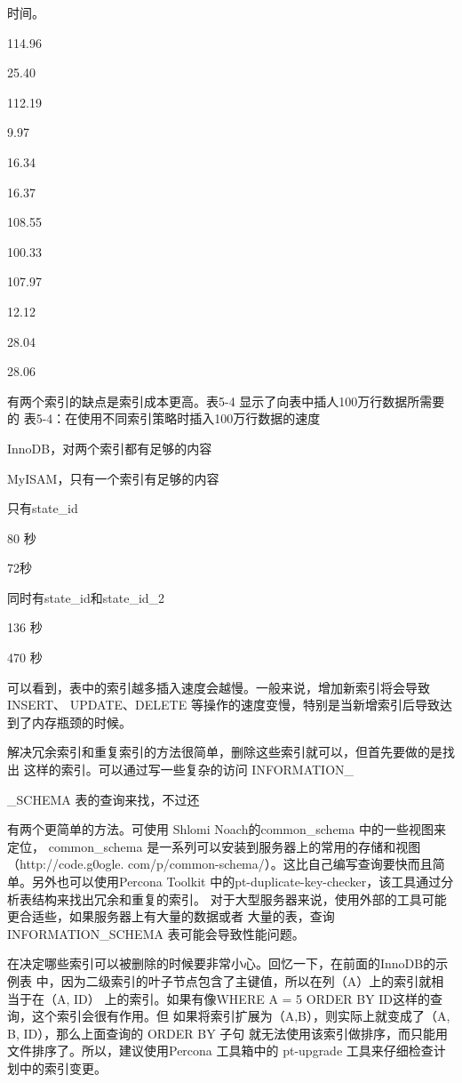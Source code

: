 时间。

114.96

25.40

112.19

9.97

16.34

16.37

108.55

100.33

107.97

12.12

28.04

28.06

有两个索引的缺点是索引成本更高。表5-4 显示了向表中插人100万行数据所需要的
表5-4：在使用不同索引策略时插入100万行数据的速度

InnoDB，对两个索引都有足够的内容

MyISAM，只有一个索引有足够的内容

只有state\_id

80 秒

72秒

同时有state\_id和state\_id\_2

136 秒

470 秒

可以看到，表中的索引越多插入速度会越慢。一般来说，增加新索引将会导致 INSERT、
UPDATE、DELETE 等操作的速度变慢，特别是当新增索引后导致达到了内存瓶颈的时候。

解决冗余索引和重复索引的方法很简单，删除这些索引就可以，但首先要做的是找出
这样的索引。可以通过写一些复杂的访问 INFORMATION\_

\_SCHEMA 表的查询来找，不过还

有两个更简单的方法。可使用 Shlomi Noach的common\_schema 中的一些视图来定位，
common\_schema 是一系列可以安装到服务器上的常用的存储和视图 （http://code.g0ogle.
com/p/common-schema/）。这比自己编写查询要快而且简单。另外也可以使用Percona
Toolkit 中的pt-duplicate-key-checker，该工具通过分析表结构来找出冗余和重复的索引。
对于大型服务器来说，使用外部的工具可能更合适些，如果服务器上有大量的数据或者
大量的表，查询 INFORMATION\_SCHEMA 表可能会导致性能问题。

在决定哪些索引可以被删除的时候要非常小心。回忆一下，在前面的InnoDB的示例表
中，因为二级索引的叶子节点包含了主键值，所以在列（A）上的索引就相当于在（A, ID）
上的索引。如果有像WHERE A = 5 ORDER BY ID这样的查询，这个索引会很有作用。但
如果将索引扩展为（A,B），则实际上就变成了（A, B, ID），那么上面查询的 ORDER BY 子句
就无法使用该索引做排序，而只能用文件排序了。所以，建议使用Percona 工具箱中的
pt-upgrade 工具来仔细检查计划中的索引变更。

